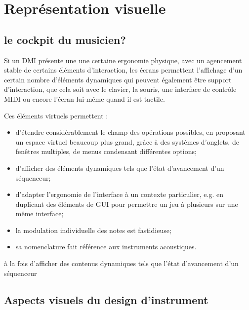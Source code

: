 %
\chapter{Représentation visuelle}
\label{ch:visual_representation}



\section{le cockpit du musicien?}
Si un DMI présente une une certaine ergonomie physique, avec un agencement stable de certains éléments d'interaction, les écrans permettent l'affichage d'un certain nombre d'éléments dynamiques qui peuvent également être support d'interaction, que cela soit avec le clavier, la souris, une interface de contrôle MIDI ou encore l'écran lui-même quand il est tactile.

Ces éléments virtuels permettent :
\vspace{-1em}
\begin{itemize}[noitemsep]
	\item d'étendre considérablement le champ des opérations possibles, en proposant un espace virtuel beaucoup plus grand, grâce à des systèmes d'onglets, de fenêtres multiples, de menus condensant différentes options;
	\item d'afficher des éléments dynamiques tels que l'état d'avancement d'un séquenceur;
	\item d'adapter l'ergonomie de l'interface à un contexte particulier, e.g. en duplicant des éléments de GUI pour permettre un jeu à plusieurs sur une même interface;
	\item la modulation individuelle des notes est fastidieuse;
	\item sa nomenclature fait référence aux instruments acoustiques.
\end{itemize}

à la fois d'afficher des contenus dynamiques tels que l'état d'avancement d'un séquenceur

\section{Aspects visuels du design d'instrument}

